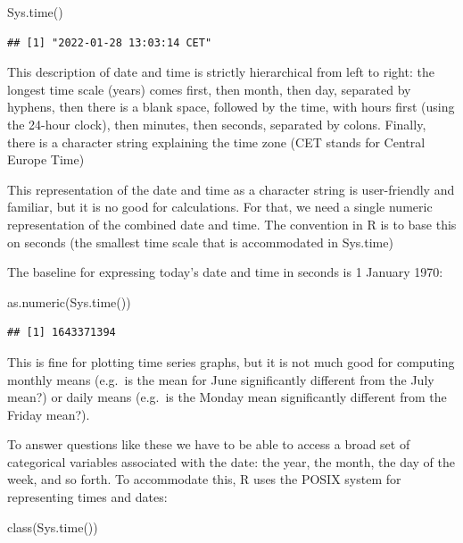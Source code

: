 \documentclass[
]{book}
\newenvironment{Shaded}{\begin{snugshade}}{\end{snugshade}}
\newcommand{\FunctionTok}[1]{\textcolor[rgb]{0.00,0.00,0.00}{#1}}
\newcommand{\NormalTok}[1]{#1}
\theoremstyle{definition}
\theoremstyle{definition}
\theoremstyle{definition}
\theoremstyle{definition}
\theoremstyle{remark}
\begin{document}
\begin{Shaded}
\begin{Highlighting}[]
\FunctionTok{Sys.time}\NormalTok{()}
\end{Highlighting}
\end{Shaded}

\begin{verbatim}
## [1] "2022-01-28 13:03:14 CET"
\end{verbatim}

This description of date and time is strictly hierarchical from left to right: the longest time scale (years) comes first, then month, then day, separated by hyphens, then there is a blank space, followed by the time, with hours first (using the 24-hour clock), then minutes, then seconds, separated by colons. Finally, there is a character string explaining the time zone (CET stands for Central Europe Time)

This representation of the date and time as a character string is user-friendly and familiar, but it is no good for calculations. For that, we need a single numeric representation of the combined date and time. The convention in R is to base this on seconds (the smallest time scale that is accommodated in Sys.time)

The baseline for expressing today's date and time in seconds is 1 January 1970:

\begin{Shaded}
\begin{Highlighting}[]
\FunctionTok{as.numeric}\NormalTok{(}\FunctionTok{Sys.time}\NormalTok{())}
\end{Highlighting}
\end{Shaded}

\begin{verbatim}
## [1] 1643371394
\end{verbatim}

This is fine for plotting time series graphs, but it is not much good for computing monthly means (e.g.~is the mean for June significantly different from the July mean?) or daily means (e.g.~is the Monday mean significantly different from the Friday mean?).

To answer questions like these we have to be able to access a broad set of categorical variables associated with the date: the year, the month, the day of the week, and so forth. To accommodate this, R uses the POSIX system for representing times and dates:

\begin{Shaded}
\begin{Highlighting}[]
\FunctionTok{class}\NormalTok{(}\FunctionTok{Sys.time}\NormalTok{())}
\end{Highlighting}
\end{Shaded}
\end{document}
